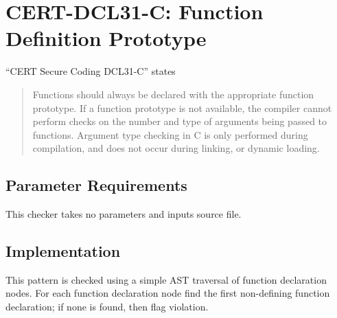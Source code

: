 %
%

\section{CERT-DCL31-C: Function Definition Prototype}
\label{FunctionDefinitionPrototype::overview}
``CERT Secure Coding DCL31-C'' states
\begin{quote}
Functions should always be declared with the appropriate function prototype. If a function prototype is not available, the compiler cannot perform checks on the number and type of arguments being passed to functions. Argument type checking in C is only performed during compilation, and does not occur during linking, or dynamic loading.
\end{quote}

\subsection{Parameter Requirements}
This checker takes no parameters and inputs source file.

\subsection{Implementation}
This pattern is checked using a simple AST traversal of function declaration nodes. For each function declaration node find the first non-defining function declaration; if none is found, then flag violation.

